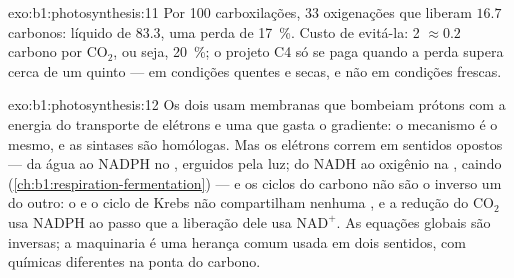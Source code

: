 \begin{solution}{exo:b1:photosynthesis:11}
Por 100 carboxilações, 33 oxigenações que liberam $16.7$ carbonos:
líquido de $83.3$, uma perda de \qty{17}{\%}. Custo de evitá-la: 2 
$\approx
0.2$ carbono por $\mathrm{CO_2}$, ou seja, \qty{20}{\%}; o projeto C4 só
se paga quando a perda supera cerca de um quinto --- em condições
quentes e secas, e não em condições frescas.
\end{solution}

\begin{solution}{exo:b1:photosynthesis:12}
Os dois usam membranas que bombeiam prótons com a energia do transporte
de elétrons e uma  que gasta o gradiente: o mecanismo é o
mesmo, e as sintases são homólogas. Mas os elétrons correm em sentidos
opostos --- da água ao NADPH no , erguidos pela luz; do NADH
ao oxigênio na , caindo
(\cref{ch:b1:respiration-fermentation}) --- e os ciclos do carbono não
são o inverso um do outro: o  e o ciclo de Krebs não
compartilham nenhuma , e a redução do $\mathrm{CO_2}$ usa NADPH ao
passo que a liberação dele usa $\mathrm{NAD^+}$. As equações globais são
inversas; a maquinaria é uma herança comum usada em dois sentidos, com
químicas diferentes na ponta do carbono.
\end{solution}

